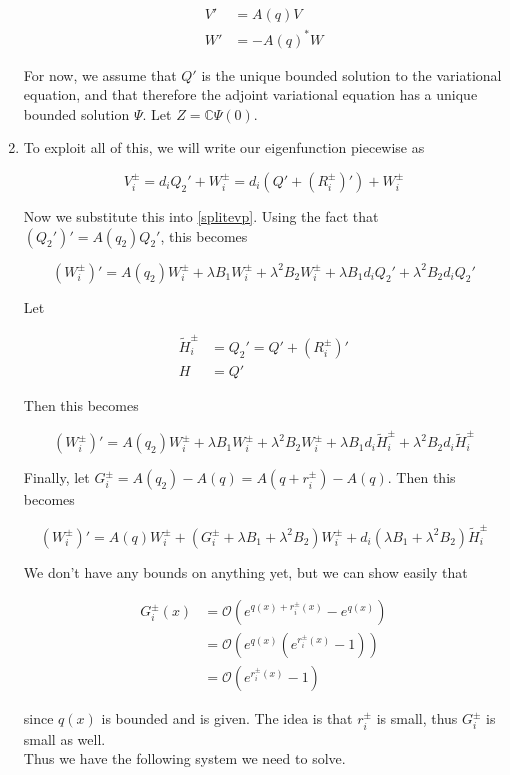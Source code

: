 \documentclass[12pt]{article}
\def\C{{\mathbb C}}
\begin{document}
\begin{enumerate}
\begin{align}
V' &= A(q)V \\
W' &= -A(q)^* W
\end{align}

For now, we assume that $Q'$ is the unique bounded solution to the variational equation, and that therefore the adjoint variational equation has a unique bounded solution $\Psi$. Let $Z = \C \Psi(0)$.

\item To exploit all of this, we will write our eigenfunction piecewise as

\[
V_i^\pm = d_i Q_2' + W_i^\pm = d_i(Q' + (R_i^\pm)') + W_i^\pm
\]


Now we substitute this into \eqref{splitevp}. Using the fact that $(Q_2')' = A(q_2)Q_2'$, this becomes

\[
(W_i^\pm)' =A(q_2)W_i^\pm + \lambda B_1 W_i^\pm + \lambda^2 B_2 W_i^\pm 
+ \lambda B_1 d_i Q_2' + \lambda^2 B_2 d_i Q_2' 
\]

Let 

\begin{align*}
\tilde{H}_i^\pm &= Q_2' = Q' + (R_i^\pm)' \\
H &= Q'
\end{align*}

Then this becomes

\[
(W_i^\pm)' =A(q_2)W_i^\pm + \lambda B_1 W_i^\pm + \lambda^2 B_2 W_i^\pm 
+ \lambda B_1 d_i \tilde{H}_i^\pm + \lambda^2 B_2 d_i \tilde{H}_i^\pm 
\]

Finally, let $G_i^\pm = A(q_2) - A(q) = A(q + r_i^\pm) - A(q)$. Then this becomes

\[
(W_i^\pm)' =A(q)W_i^\pm + (G_i^\pm + \lambda B_1 + \lambda^2 B_2) W_i^\pm 
+ d_i( \lambda B_1 + \lambda^2 B_2 ) \tilde{H}_i^\pm 
\]

We don't have any bounds on anything yet, but we can show easily that

\begin{align*}
G_i^\pm(x) &= \mathcal{O}(e^{q(x) + r_i^\pm(x)} - e^{q(x)} )\\
&= \mathcal{O}(e^{q(x)}(e^{r_i^\pm(x)} - 1)) \\
&= \mathcal{O}(e^{r_i^\pm(x)} - 1)
\end{align*}

since $q(x)$ is bounded and is given. The idea is that $r_i^\pm$ is small, thus $G_i^\pm$ is small as well.\\

Thus we have the following system we need to solve.


\end{enumerate}
\end{document}
